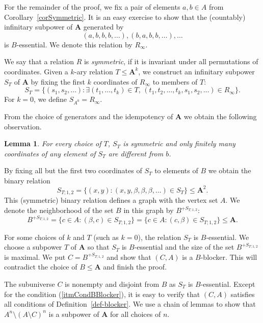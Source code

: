 \documentclass{amsart}
\theoremstyle{plain}
\newtheorem{lemma}[theorem]{Lemma}
\theoremstyle{definition}
\begin{document}
For the remainder of the proof, we  fix a pair of
elements $a,b\in A$ from Corollary~\ref{corSymmetric}. It is an easy exercise to show that the (countably) infinitary subpower of ${{\mathbf{A}}}$ generated by
\[
(a,b,b,b,\dots), (b,a,b,b,\dots), \dots
\] 
is $B$-essential.  We denote this
relation by $R_\infty$.

We say that a relation $R$ is \emph{symmetric}, if it is invariant under all 
permutations of coordinates. Given a $k$-ary relation $T\leq {{\mathbf{A}}}^k$, 
we construct an infinitary subpower $S_T$ of ${{\mathbf{A}}}$ by fixing the first $k$
coordinates of $R_\infty$ to members of $T$:
\[
  S_T=\{(s_1,s_2,\dots) \colon \exists (t_1,\dots,t_k)\in T,\,
  (t_1,t_2,\dots,t_k,s_1,s_2,\dots)\in R_\infty\}. 
\]
For $k=0$, we define $S_{A^0}=R_\infty$. 

From the choice of generators and the idempotency of ${{\mathbf{A}}}$ we obtain the following observation. 

\begin{lemma}\label{lembbbbb}
  For every choice of $T$, $S_T$ is symmetric and only finitely many coordinates of any element of 
  $S_T$ are different from $b$.
\end{lemma}

By fixing  all but the first two coordinates of $S_T$ to elements of $B$ we
obtain the binary relation
\[
  S_{T;1,2}=\{(x,y) \colon (x,y,\beta,\beta,\beta,\dots)\in S_T\} \leq {{\mathbf{A}}}^2.
\]
This (symmetric) binary relation defines a graph with the vertex set $A$. We denote the
neighborhood of the set $B$ in this graph  by $B^{+S_{T;1,2}}$:
\[
  B^{+S_{T;1,2}}=\{c\in A \colon (\beta,c)\in S_{T;1,2}\} = \{c \in A \colon (c,\beta) \in S_{T;1,2}\} \leq {{\mathbf{A}}}.
\]

For some choices of $k$ and $T$ (such as $k=0$), the relation $S_T$ is
$B$-essential. We choose a subpower $T$ of ${{\mathbf{A}}}$ so that $S_T$ is
$B$-essential and the size of the set $B^{+S_{T;1,2}}$ is maximal. We put
$C=B^{+S_{T;1,2}}$ and show that $(C,A)$ is a $B$-blocker. This will contradict the
choice of $B \leq {{\mathbf{A}}}$ and finish the proof. 

The subuniverse $C$ is nonempty and disjoint from $B$ as $S_T$ is
$B$-essential. Except for the condition (\ref{itmCondBBlocker}), it is easy to 
verify that $(C,A)$ satisfies all conditions of
Definition~\ref{def-blocker}. We use a chain of lemmas to show that $A^n\setminus (A\setminus C)^n$ is
a subpower of ${{\mathbf{A}}}$ for all choices of $n$.
\end{document}
